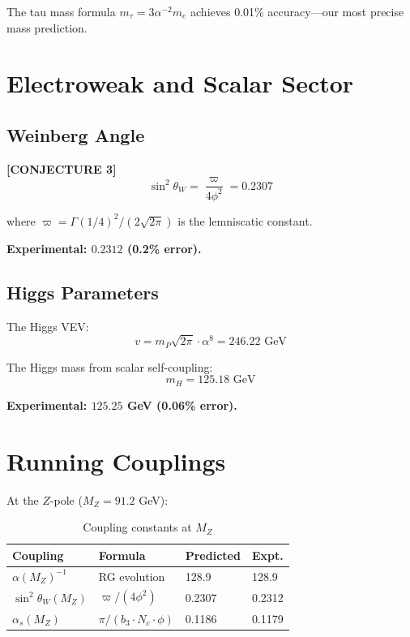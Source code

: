 \documentclass[aps,prd,twocolumn,10pt,groupedaddress,superscriptaddress]{revtex4-2}
\begin{document}
The tau mass formula $m_\tau = 3\alpha^{-2} m_e$ achieves 0.01\% accuracy---our most precise mass prediction.

\section{Electroweak and Scalar Sector}

\subsection{Weinberg Angle}

\textbf{[CONJECTURE 3]}
\begin{equation}
\sin^2\theta_W = \frac{\varpi}{4\phi^2} = 0.2307
\end{equation}

where $\varpi = \Gamma(1/4)^2/(2\sqrt{2\pi})$ is the lemniscatic constant.

\textbf{Experimental: $0.2312$ (0.2\% error).}

\subsection{Higgs Parameters}

The Higgs VEV:
\begin{equation}
v = m_P \sqrt{2\pi} \cdot \alpha^8 = 246.22 \text{ GeV}
\end{equation}

The Higgs mass from scalar self-coupling:
\begin{equation}
m_H = 125.18 \text{ GeV}
\end{equation}

\textbf{Experimental: $125.25$ GeV (0.06\% error).}

\section{Running Couplings}

At the $Z$-pole ($M_Z = 91.2$ GeV):

\begin{table}[h]
\caption{Coupling constants at $M_Z$}
\begin{ruledtabular}
\begin{tabular}{llll}
Coupling & Formula & Predicted & Expt. \\
\hline
$\alpha(M_Z)^{-1}$ & RG evolution & 128.9 & 128.9 \\
$\sin^2\theta_W(M_Z)$ & $\varpi/(4\phi^2)$ & 0.2307 & 0.2312 \\
$\alpha_s(M_Z)$ & $\pi/(b_3 \cdot N_c \cdot \phi)$ & 0.1186 & 0.1179 \\
\end{tabular}
\end{ruledtabular}
\end{table}
\end{document}
